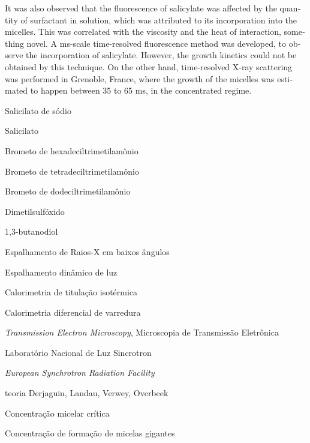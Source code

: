 \documentclass[
	12pt,				%
	openright,			%
	twoside,			%
	a4paper,			%
	english,			%
	brazil%
	]{abntex2}
\newcommand{\Sal}{Sal\textsuperscript{--}}
\newcommand{\cmc}{CMC}
\newcommand{\cwlm}{\(\mathrm{C}_{\mathrm{WLM}}\)}
\newcommand{\CTAB}{C\textsubscript{16}TAB}
\newcommand{\TTAB}{C\textsubscript{14}TAB}
\newcommand{\DTAB}{C\textsubscript{12}TAB}
\newcommand{\BD}{1,3-BD}
\begin{document}
\begin{resumo}[Abstract]
\begin{english}
 	It was also observed that the fluorescence of salicylate was affected by the quantity of surfactant in solution, which was attributed to its incorporation into the micelles. This was correlated with the viscosity and the heat of interaction, something novel. A ms-scale time-resolved fluorescence method was developed, to observe the incorporation of salicylate. However, the growth kinetics could not be obtained by this technique. On the other hand, time-resolved X-ray scattering was performed in Grenoble, France, where the growth of the micelles was estimated to happen between 35 to 65 ms, in the concentrated regime.
 	
   \vspace{\onelineskip}
 
   \noindent 
 \end{english}
\end{resumo}




\listoffigures*
\cleardoublepage

\listoftables*
\listoflistings
\cleardoublepage

\begin{siglas}
  \item[NaSal] Salicilato de sódio
  \item[\Sal] Salicilato
  \item[\CTAB] Brometo de hexadeciltrimetilamônio
  \item[\TTAB] Brometo de tetradeciltrimetilamônio
  \item[\DTAB] Brometo de dodeciltrimetilamônio
  \item[DMSO] Dimetilsulfóxido
  \item[\BD] 1,3-butanodiol
  \item[SAXS] Espalhamento de Raios-X em baixos ângulos
  \item[DLS] Espalhamento dinâmico de luz
  \item[ITC] Calorimetria de titulação isotérmica
  \item[DSC] Calorimetria diferencial de varredura
  \item[TEM] \emph{Transmission Electron Microscopy}, Microscopia de Transmissão Eletrônica
  \item[LNLS] Laboratório Nacional de Luz Sincrotron
  \item[ESRF] \emph{European Synchrotron Radiation Facility}
  \item[DLVO] teoria Derjaguin, Landau, Verwey, Overbeek
  \item[\cmc] Concentração micelar crítica
  \item[\cwlm] Concentração de formação de micelas gigantes
  
\end{siglas}
\end{document}
